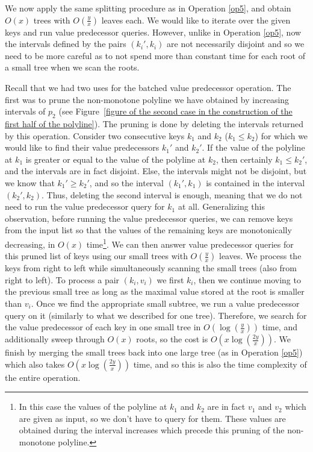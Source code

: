 \documentclass[a4paper,UKenglish]{lipics-v2016}
\theoremstyle{plain}
\begin{document}
We now apply the same splitting procedure as in Operation \ref{op5}, and obtain $O(x)$ trees with $O(\frac{y}{x})$ leaves each. We would like to iterate over the given keys and run value predecessor queries. However, unlike in Operation \ref{op5}, now the intervals defined by the pairs $(k_i',k_i)$ are not necessarily disjoint and so we need to be more careful as to not spend more than constant time for each root of a small tree when we scan the roots.

Recall that we had two uses for the batched value predecessor operation. The first was to prune the non-monotone polyline we have obtained by increasing intervals of $p_2$ (see Figure~\ref{figure of the second case in the construction of the first half of the polyline}). The pruning is done by deleting the intervals returned by this operation.
%
Consider two consecutive keys $k_1$ and $k_2$ ($k_1 \leq k_2$) for which we would like to find their value predecessors $k_1'$ and $k_2'$. If the value of the polyline at $k_1$  is greater or equal to the value  of the polyline at $k_2$, then certainly $k_1 \leq k_2'$, and the intervals are in fact disjoint. Else, the intervals might not be disjoint, but we know that $k_1' \geq k_2'$, and so the interval $(k_1',k_1)$ is contained in the interval $(k_2',k_2)$. Thus, deleting the second interval is enough, meaning that we do not need to run the value predecessor query for $k_1$ at all. Generalizing this observation, before running the value predecessor queries, we can remove keys from the input list
so that the values of the remaining keys are  monotonically decreasing, in $O(x)$ time\footnote{In this case the values of the polyline at $k_1$ and $k_2$ are in fact $v_1$ and $v_2$ which are given as input, so we don't have to query for them. These values are obtained during the interval increases which precede this pruning of the non-monotone polyline.}. 
We can then answer value predecessor queries for this pruned list of keys using our small trees with $O(\frac{y}{x})$ leaves. We process the keys from right to left while simultaneously scanning the small trees (also from right to left). To process a pair $(k_{i},v_{i})$ we first $k_{i}$, then we continue moving to the previous small tree as long as the maximal value stored at the root is smaller than $v_{i}$. Once we find the appropriate small subtree, we run a value predecessor query on it (similarly to what we described for one tree). 
%
Therefore, we search for the value predecessor of each key in one small tree in $O(\log(\frac{y}{x}))$ time,
and additionally sweep through $O(x)$ roots, so the cost is $O(x \log (\frac{2y}{x}))$. We finish by merging the small trees back into one large tree (as in Operation \ref{op5}) which also takes $O(x \log (\frac{2y}{x}))$ time, and so this is also the time complexity of the entire operation.
\end{document}
